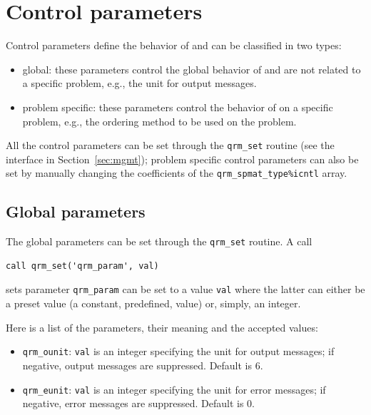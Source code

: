 \documentclass[11pt]{article}
\begin{document}
\section{Control parameters}
\label{sec:cntl}

Control parameters define the behavior of \qrm and can be classified
in two types:
\begin{itemize}
\item global: these parameters control the global behavior of \qrm and
  are not related to a specific problem, e.g., the unit for output
  messages.
\item problem specific: these parameters control the behavior of \qrm
  on a specific problem, e.g., the ordering method to be used on the
  problem.
\end{itemize}

All the control parameters can be set through the \texttt{qrm\_set}
routine (see the interface in Section~\ref{sec:mgmt}); problem
specific control parameters can also be set by manually changing the
coefficients of the \texttt{qrm\_spmat\_type\%icntl} array. 

\subsection{Global parameters}
The global parameters can be set through the \texttt{qrm\_set}
routine. A call
\begin{lstlisting}
call qrm_set('qrm_param', val)
\end{lstlisting}
sets parameter \texttt{qrm\_param} can be set to a value \texttt{val}
where the latter can either be a preset value (a constant, predefined,
value) or, simply, an integer.

Here is a list of the parameters, their meaning and the accepted
values:

\begin{itemize}
\item \texttt{qrm\_ounit}: \texttt{val} is an integer specifying the
  unit for output messages; if negative, output messages are
  suppressed. Default is 6.
\item \texttt{qrm\_eunit}:  \texttt{val} is an integer specifying the
  unit for error messages; if negative, error messages are suppressed.
  Default is 0.
\end{itemize}
\end{document}
